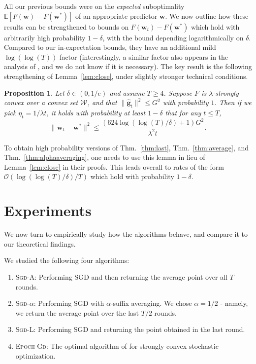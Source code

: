 \documentclass{article}
\newtheorem{proposition}{Proposition}
\newcommand{\E}{\mathbb{E}}
\newcommand{\bw}{\mathbf{w}}
\newcommand{\bg}{\mathbf{g}}
\newcommand{\Ocal}{\mathcal{O}}
\newcommand{\Wcal}{\mathcal{W}}
\newcommand{\norm}[1]{\|#1\|}
\newcommand{\lemref}[1]{Lemma~\ref{#1}}
\newcommand{\thmref}[1]{Thm.~\ref{#1}}
\begin{document}
All our previous bounds were on the \emph{expected} suboptimality $\E[F(\bw)-F(\bw^{*})]$ of an appropriate predictor $\bw$. We now outline how these results can be strengthened to bounds on $F(\bw_t)-F(\bw^{*})$ which hold with arbitrarily high probability $1-\delta$, with the bound depending logarithmically on $\delta$. Compared to our in-expectation bounds, they have an additional mild $\log(\log(T))$ factor (interestingly, a similar factor also appears in the analysis of \cite{HazanKa11}, and we do not know if it is necessary). The key result is the following strengthening of \lemref{lem:close}, under slightly stronger technical conditions.

\begin{proposition}\label{prop:closehighprob}
Let $\delta \in (0,1/e)$ and assume $T\geq 4$. Suppose $F$ is $\lambda$-strongly convex over a convex set $\Wcal$, and that $\norm{\hat{\bg}_t}^2\leq G^2$ with probability $1$. Then if we pick $\eta_t = 1/\lambda t$, it holds with probability at least $1-\delta$ that for any $t\leq T$,
\[
\norm{\bw_t-\bw^{*}}^2 \leq \frac{(624\log(\log(T)/\delta)+1)G^2}{\lambda^2 t}.
\]
\end{proposition}
To obtain high probability versions of \thmref{thm:last}, \thmref{thm:average}, and \thmref{thm:alphaaveraging}, one needs to use this lemma in lieu of \lemref{lem:close} in their proofs. This leads overall to rates of the form $\Ocal(\log(\log(T)/\delta)/T)$ which hold with probability $1-\delta$.

\section{Experiments}\label{sec:experiments}

We now turn to empirically study how the algorithms behave, and compare it to our theoretical findings.

We studied the following four algorithms:
\begin{enumerate}
    \item \textsc{Sgd-A}: Performing SGD and then returning the average point over all $T$ rounds.
    \item \textsc{Sgd-$\alpha$}: Performing SGD with $\alpha$-suffix averaging. We chose $\alpha=1/2$ - namely, we return the average point over the last $T/2$ rounds.
    \item \textsc{Sgd-L}: Performing SGD and returning the point obtained in the last round.
    \item \textsc{Epoch-Gd}: The optimal algorithm of \cite{HazanKa11} for strongly convex stochastic optimization.
\end{enumerate}
\end{document}
